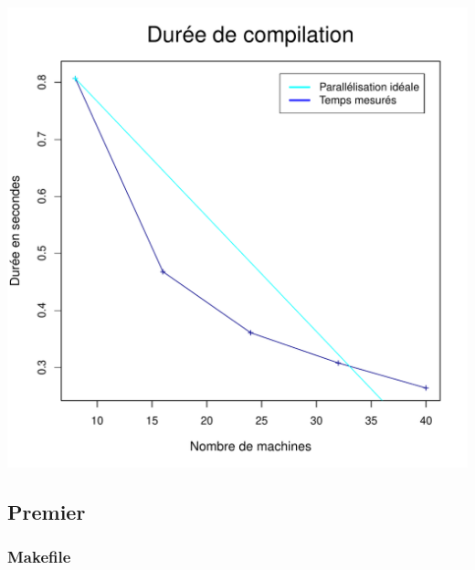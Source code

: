 \documentclass[a4paper, 11pt, titlepage]{article}
\begin{document}
\begin{center}
    \includegraphics[scale=0.6]{res/sujet_makefiles_matrix_Makefile_nth1.pdf}
\end{center}


\subsection {Premier}

\subsubsection {Makefile}
\end{document}
